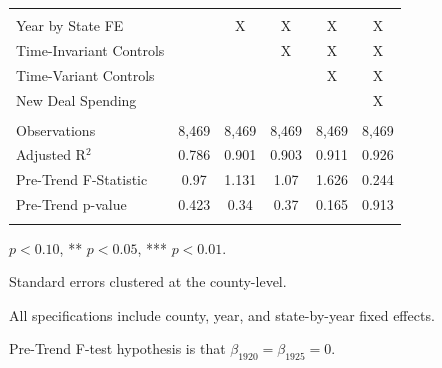 \documentclass[12pt]{article}
\begin{document}
\begin{table}
\begin{threeparttable}[t]
\begin{tabular}{@{\extracolsep{5pt}}lccccc}
              &                 &                 &                 &                 & \\
Year by State FE &  & X & X & X & X \\ 
Time-Invariant Controls &  &  & X & X & X \\ 
Time-Variant Controls &  &  &  & X & X \\ 
New Deal Spending &  &  &  &  & X \\ 
\hline \\[-1.8ex] 
Observations          & 8,469 & 8,469 & 8,469 & 8,469 & 8,469 \\ 
Adjusted R$^{2}$      & 0.786 & 0.901 & 0.903 & 0.911 & 0.926 \\ 
Pre-Trend F-Statistic & 0.97 & 1.131 & 1.07 & 1.626 & 0.244 \\ 
Pre-Trend p-value     & 0.423 & 0.34 & 0.37 & 0.165 & 0.913 \\ 
\hline 
\hline \\[-1.8ex] 

\end{tabular}
\begin{tablenotes}
\item {\footnotesize * \(p<0.10\), ** \(p<0.05\), *** \(p<0.01\).}
\item {\footnotesize Standard errors clustered at the county-level.}
\item {\footnotesize All specifications include county, year, and state-by-year fixed effects.}
\item {\footnotesize Pre-Trend F-test hypothesis is that $\beta_{1920} = \beta_{1925}=0$.}

\end{tablenotes}
\end{threeparttable} 
\end{table}
\end{document}
